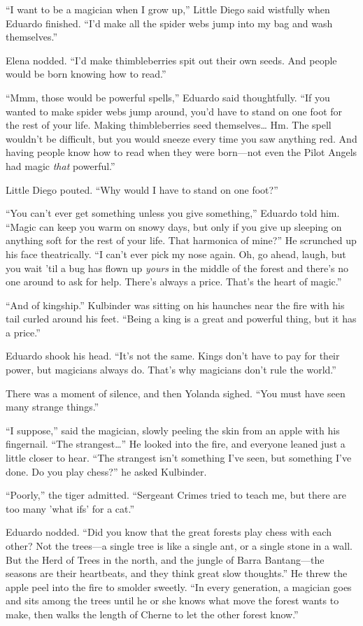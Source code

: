 \documentclass[10pt]{book}
\begin{document}
``I want to be a magician when I grow up,'' Little Diego said wistfully when Eduardo finished. ``I'd make all the spider webs jump into my bag and wash themselves.''

Elena nodded. ``I'd make thimbleberries spit out their own seeds. And people would be born knowing how to read.''

``Mmm, those would be powerful spells,'' Eduardo said thoughtfully. ``If you wanted to make spider webs jump around, you'd have to stand on one foot for the rest of your life. Making thimbleberries seed themselves{\ldots} Hm. The spell wouldn't be difficult, but you would sneeze every time you saw anything red. And having people know how to read when they were born---not even the Pilot Angels had magic \emph{that} powerful.''

Little Diego pouted. ``Why would I have to stand on one foot?''

``You can't ever get something unless you give something,'' Eduardo told him. ``Magic can keep you warm on snowy days, but only if you give up sleeping on anything soft for the rest of your life. That harmonica of mine?'' He scrunched up his face theatrically.  ``I can't ever pick my nose again.  Oh, go ahead, laugh, but you wait 'til a bug has flown up \emph{yours} in the middle of the forest and there's no one around to ask for help. There's always a price. That's the heart of magic.''

``And of kingship.'' Kulbinder was sitting on his haunches near the fire with his tail curled around his feet. ``Being a king is a great and powerful thing, but it has a price.''

Eduardo shook his head. ``It's not the same. Kings don't have to pay for their power, but magicians always do. That's why magicians don't rule the world.''

There was a moment of silence, and then Yolanda sighed. ``You must have seen many strange things.''

``I suppose,'' said the magician, slowly peeling the skin from an apple with his fingernail. ``The strangest{\ldots}'' He looked into the fire, and everyone leaned just a little closer to hear. ``The strangest isn't something I've seen, but something I've done. Do you play chess?'' he asked Kulbinder.

``Poorly,'' the tiger admitted. ``Sergeant Crimes tried to teach me, but there are too many 'what ifs' for a cat.''

Eduardo nodded. ``Did you know that the great forests play chess with each other? Not the trees---a single tree is like a single ant, or a single stone in a wall. But the Herd of Trees in the north, and the jungle of Barra Bantang---the seasons are their heartbeats, and they think great slow thoughts.'' He threw the apple peel into the fire to smolder sweetly. ``In every generation, a magician goes and sits among the trees until he or she knows what move the forest wants to make, then walks the length of Cherne to let the other forest know.''
\end{document}
